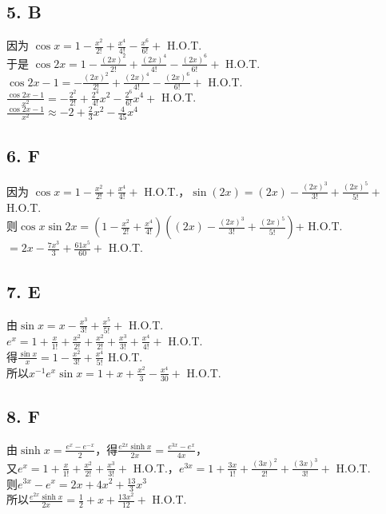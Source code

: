 \documentclass[a5paper, 11pt]{article}
\begin{document}
\subsection*{5. B}
因为 $\cos x = 1 - \frac{x^2}{2!} + \frac{x^4}{4!} - \frac{x^6}{6!}  +$ H.O.T.\\
于是 $\cos 2x = 1 - \frac{(2x)^2}{2!} + \frac{(2x)^4}{4!} - \frac{(2x)^6}{6!}  +$ H.O.T.\\
\hspace*{22pt} $\cos 2x - 1 = - \frac{(2x)^2}{2!} + \frac{(2x)^4}{4!} - \frac{(2x)^6}{6!}  +$ H.O.T.\\
\hspace*{22pt} $\frac{\cos 2x - 1}{x^2} = - \frac{2^2}{2!} + \frac{2^4}{4!}x^2 - \frac{2^6}{6!}x^4  +$ H.O.T.\\
\hspace*{22pt} $\frac{\cos 2x - 1}{x^2} \approx -2 + \frac{2}{3} x^2 - \frac{4}{45} x^4$

\subsection*{6. F}
因为 $\cos x = 1 - \frac{x^2}{2!} + \frac{x^4}{4!}  +$ H.O.T.，$\sin (2x) = (2x) - \frac{(2x)^3}{3!} + \frac{(2x)^5}{5!} +$ H.O.T.\\
则$\cos x \sin 2x = (1 - \frac{x^2}{2!} + \frac{x^4}{4!} )((2x) - \frac{(2x)^3}{3!} + \frac{(2x)^5}{5!}) $+ H.O.T.\\
\hspace*{64pt}$= 2x - \frac{7x^3}{3} + \frac{61x^5}{60} +$ H.O.T. 

\subsection*{7. E}
由$\sin x = x - \frac{x^3}{3!} + \frac{x^5}{5!} +$ H.O.T.\\
$e^x = 1 + \frac{x}{1!} + \frac{x^2}{2!} + \frac{x^2}{2!} + \frac{x^3}{3!} + \frac{x^4}{4!}  +$ H.O.T.\\
得$\frac{\sin x}{x} = 1 - \frac{x^2}{3!} + \frac{x^4}{5!}$ H.O.T.\\
所以$x^{-1} e^x \sin x = 1 + x + \frac{x^2}{3} - \frac{x^4}{30} +$ H.O.T. 

\subsection*{8. F}
由$\sinh x = \frac{e^x - e^{-x}}{2}$，得$\frac{e^{2x}\sinh x}{2x} = \frac{e^{3x} - e^x}{4x}$，\\
又$e^x = 1 + \frac{x}{1!} + \frac{x^2}{2!} + \frac{x^3}{3!} +$ H.O.T.，$e^{3x} = 1 + \frac{3x}{1!} + \frac{(3x)^2}{2!} +\frac{(3x)^3}{3!} +$ H.O.T.\\
则$e^{3x} - e^x = 2x + 4x^2 + \frac{13}{3}x^3$\\
所以$\frac{e^{2x} \sinh x}{2x} = \frac{1}{2} + x +  \frac{13x^2}{12} +$ H.O.T. \\
\end{document}
